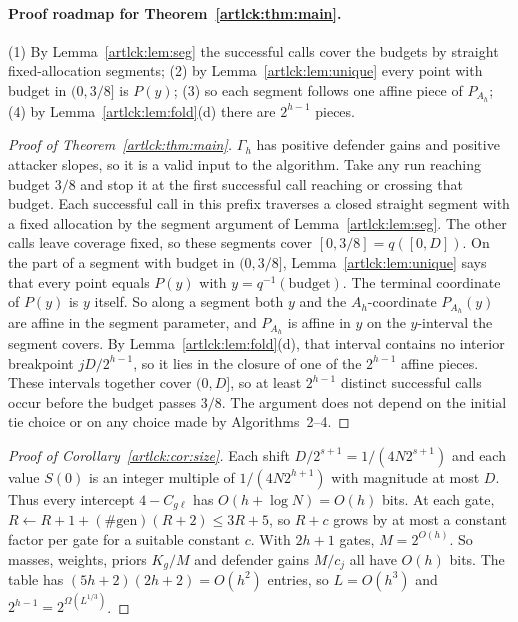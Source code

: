 \paragraph{Proof roadmap for Theorem~\ref{artlck:thm:main}.} (1) By Lemma~\ref{artlck:lem:seg} the
successful calls cover the budgets by straight fixed-allocation segments; (2) by
Lemma~\ref{artlck:lem:unique} every point with budget in $(0,3/8]$ is $P(y)$; (3) so each segment follows
one affine piece of $P_{A_h}$; (4) by Lemma~\ref{artlck:lem:fold}(d) there are $2^{h-1}$ pieces.

\begin{proof}[Proof of Theorem~\ref{artlck:thm:main}]
$\Gamma_h$ has positive defender gains and positive attacker slopes, so it is a valid input to the
algorithm. Take any run reaching budget $3/8$ and stop it at the first
successful call reaching or crossing that budget. Each successful call
in this prefix traverses a closed straight segment with a fixed allocation
by the segment argument of Lemma~\ref{artlck:lem:seg}. The other calls
leave coverage fixed, so these segments cover $[0,3/8]=q([0,D])$.
On the part of a segment with
budget in $(0,3/8]$, Lemma~\ref{artlck:lem:unique} says that every point equals $P(y)$ with
$y=q^{-1}(\text{budget})$. The terminal coordinate of $P(y)$ is $y$ itself. So along a segment both $y$
and the $A_h$-coordinate $P_{A_h}(y)$ are affine in the segment parameter, and $P_{A_h}$ is affine in $y$
on the $y$-interval the segment covers. By Lemma~\ref{artlck:lem:fold}(d), that interval contains no
interior breakpoint $jD/2^{h-1}$, so it lies in the closure of one of the $2^{h-1}$ affine pieces. These
intervals together cover $(0,D]$, so at least $2^{h-1}$ distinct successful calls occur before the
budget passes $3/8$. The argument does not depend on the initial tie choice or on any choice made by
Algorithms~2--4.
\end{proof}

\begin{proof}[Proof of Corollary~\ref{artlck:cor:size}]
Each shift $D/2^{s+1}=1/(4N2^{s+1})$ and each value $S(0)$ is an
integer multiple of $1/(4N2^{h+1})$ with magnitude at most $D$.
Thus every intercept $4-C_{g\ell}$ has $O(h+\log N)=O(h)$ bits. At each
gate, $R\leftarrow R+1+(\#\mathrm{gen})(R+2)\le3R+5$, so $R+c$ grows by at most a constant factor per gate
for a suitable constant $c$. With $2h+1$ gates, $M=2^{O(h)}$. So masses, weights, priors $K_g/M$ and
defender gains $M/c_j$ all have $O(h)$ bits. The table has $(5h+2)(2h+2)=O(h^2)$ entries, so $L=O(h^3)$
and $2^{h-1}=2^{\Omega(L^{1/3})}$.
\end{proof}


